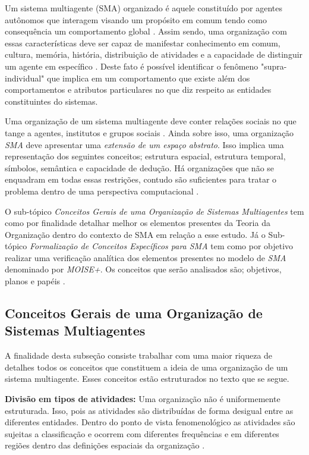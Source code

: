 Um sistema multiagente (SMA) organizado é aquele constituído por agentes autônomos que interagem visando um propósito em comum tendo como consequência um comportamento global \cite{moiseframework} \cite{organiationofmultiagentsystem}. Assim sendo, uma organização com essas características deve ser capaz de manifestar conhecimento em comum, cultura, memória, história, distribuição de atividades e a capacidade de distinguir um  agente em específico \cite{organiationofmultiagentsystem}. Deste fato é possível identificar o fenômeno "supra-individual" que implica em um comportamento que existe além dos comportamentos e atributos particulares no que diz respeito as entidades constituintes do sistemas. 

Uma organização de um sistema multiagente deve conter relações sociais no que tange a agentes, institutos e grupos sociais \cite{organiationofmultiagentsystem}. Ainda sobre isso, uma organização \textit{SMA} deve apresentar uma \textit{extensão de um espaço abstrato}. Isso implica uma representação dos seguintes conceitos; estrutura espacial, estrutura temporal, símbolos, semântica e 
capacidade de dedução. Há organizações que não se enquadram em todas essas restrições, contudo são suficientes para tratar o problema dentro de uma perspectiva computacional \cite{organiationofmultiagentsystem}.

O sub-tópico \textit{Conceitos Gerais de uma Organização de Sistemas Multiagentes} tem como por finalidade detalhar melhor os elementos presentes da Teoria da Organização dentro do contexto de SMA em relação a esse estudo. Já o Sub-tópico \textit{Formalização de Conceitos Específicos para SMA} tem como por objetivo realizar uma verificação analítica dos elementos presentes no modelo de \textit{SMA} 
denominado por \textit{MOISE+}. Os conceitos que serão analisados são; objetivos, planos e papéis \cite{organiationofmultiagentsystem}.
   

\subsection{Conceitos Gerais de uma Organização de Sistemas Multiagentes}

A finalidade desta subseção consiste trabalhar com uma maior riqueza de detalhes todos os conceitos que constituem a ideia de uma organização de um sistema multiagente. Esses conceitos estão estruturados no texto que se segue.
  
\textbf{Divisão em tipos de atividades:} Uma organização não é uniformemente estruturada. Isso, pois as atividades são distribuídas de forma desigual entre as diferentes entidades. Dentro do ponto de vista fenomenológico as atividades são sujeitas a classificação e ocorrem com diferentes frequências e em diferentes regiões dentro das definições espaciais da organização \cite{organiationofmultiagentsystem}.

